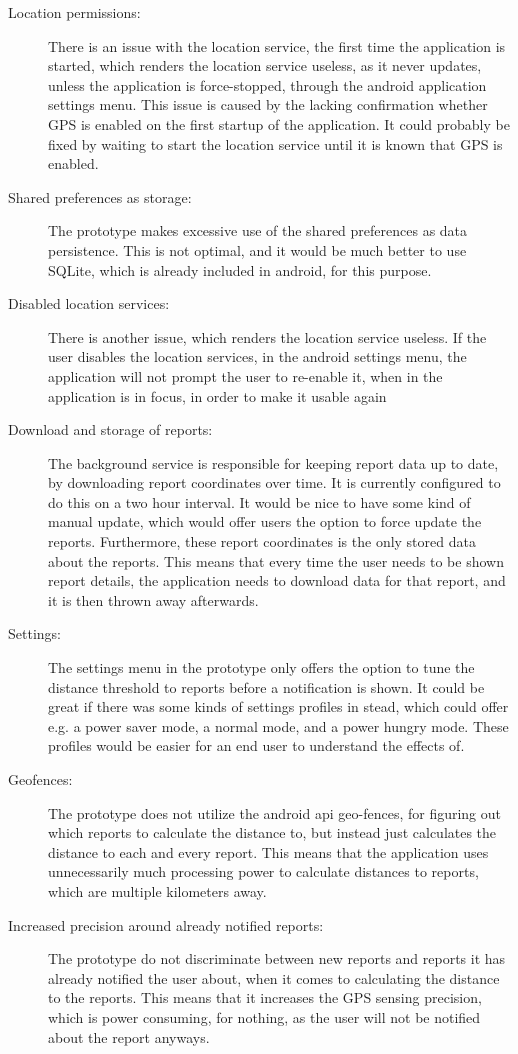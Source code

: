 \begin{description}
\item [Location permissions:] There is an issue with the location service, the first time the application is started, which renders the location service useless, as it never updates, unless the application is force-stopped, through the android application settings menu. This issue is caused by the lacking confirmation whether GPS is enabled on the first startup of the application. It could probably be fixed by waiting to start the location service until it is known that GPS is enabled.
\item [Shared preferences as storage:] The prototype makes excessive use of the shared preferences as data persistence. This is not optimal, and it would be much better to use SQLite, which is already included in android, for this purpose.
\item [Disabled location services:] There is another issue, which renders the location service useless. If the user disables the location services, in the android settings menu, the application will not prompt the user to re-enable it, when in the application is in focus, in order to make it usable again
\item [Download and storage of reports:] The background service is responsible for keeping report data up to date, by downloading report coordinates over time. It is currently configured to do this on a two hour interval. It would be nice to have some kind of manual update, which would offer users the option to force update the reports. Furthermore, these report coordinates is the only stored data about the reports. This means that every time the user needs to be shown report details, the application needs to download data for that report, and it is then thrown away afterwards.
\item [Settings:] The settings menu in the prototype only offers the option to tune the distance threshold to reports before a notification is shown. It could be great if there was some kinds of settings profiles in stead, which could offer e.g. a power saver mode, a  normal mode, and a power hungry mode. These profiles would be easier for an end user to understand the effects of.
\item [Geofences:] The prototype does not utilize the android api geo-fences, for figuring out which reports to calculate the distance to, but instead just calculates the distance to each and every report. This means that the application uses unnecessarily much processing power to calculate distances to reports, which are multiple kilometers away.
\item [Increased precision around already notified reports:] The prototype do not discriminate between new reports and reports it has already notified the user about, when it comes to calculating the distance to the reports. This means that it increases the GPS sensing precision, which is power consuming, for nothing, as the user will not be notified about the report anyways.
\end{description}

